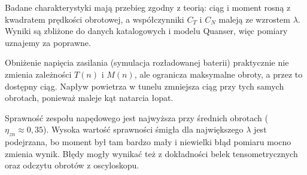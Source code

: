 \akapit Badane charakterystyki mają przebieg zgodny z teorią: ciąg i moment rosną z kwadratem prędkości obrotowej, a współczynniki $C_T$ i $C_N$ maleją ze wzrostem $\lambda$. Wyniki są zbliżone do danych katalogowych i modelu Quanser, więc pomiary uznajemy za poprawne.

\akapit Obniżenie napięcia zasilania (symulacja rozładowanej baterii) praktycznie nie zmienia zależności $T(n)$ i $M(n)$, ale ogranicza maksymalne obroty, a przez to dostępny ciąg. Napływ powietrza w tunelu zmniejsza ciąg przy tych samych obrotach, ponieważ maleje kąt natarcia łopat.

\akapit Sprawność zespołu napędowego jest najwyższa przy średnich obrotach ($\eta_{zn} \approx 0{,}35$). Wysoka wartość sprawności śmigła dla największego $\lambda$ jest podejrzana, bo moment był tam bardzo mały i niewielki błąd pomiaru mocno zmienia wynik. Błędy mogły wynikać też z dokładności belek tensometrycznych oraz odczytu obrotów z oscyloskopu.
